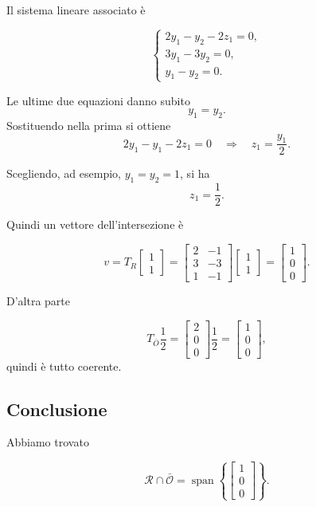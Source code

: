 Il sistema lineare associato è

\[
\begin{cases}
2y_1-y_2-2z_1=0,\\
3y_1-3y_2=0,\\
y_1-y_2=0.
\end{cases}
\]

Le ultime due equazioni danno subito
\[
y_1=y_2.
\]
Sostituendo nella prima si ottiene
\[
2y_1-y_1-2z_1=0
\quad\Longrightarrow\quad
z_1=\frac{y_1}{2}.
\]

Scegliendo, ad esempio, \(y_1=y_2=1\), si ha
\[
z_1=\frac12.
\]

Quindi un vettore dell'intersezione è

\[
v=T_R
\begin{bmatrix}
1\\1
\end{bmatrix}
=
\begin{bmatrix}
2 & -1\\
3 & -3\\
1 & -1
\end{bmatrix}
\begin{bmatrix}
1\\1
\end{bmatrix}
=
\begin{bmatrix}
1\\0\\0
\end{bmatrix}.
\]

D'altra parte

\[
T_{\bar O}\frac12
=
\begin{bmatrix}
2\\0\\0
\end{bmatrix}\frac12
=
\begin{bmatrix}
1\\0\\0
\end{bmatrix},
\]
quindi è tutto coerente.

\subsection{Conclusione}

Abbiamo trovato

\[
\mathcal R\cap\bar{\mathcal O}
=
\operatorname{span}\left\{
\begin{bmatrix}
1\\0\\0
\end{bmatrix}
\right\}.
\]

